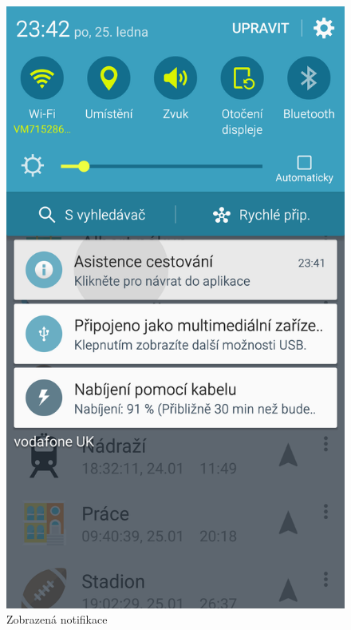 \documentclass[czech,master,public,dept460,male,java,cpdeclaration]{diploma}
\begin{document}
\begin{figure}[H]
\begin{minipage}{.5\textwidth}
                \includegraphics[scale=0.14]{img/screen/notifikace.png}
        \caption{Zobrazená notifikace}
        \label{fig:notifikacenahravanicesty}

       \end{minipage}
\end{figure}
\end{document}
